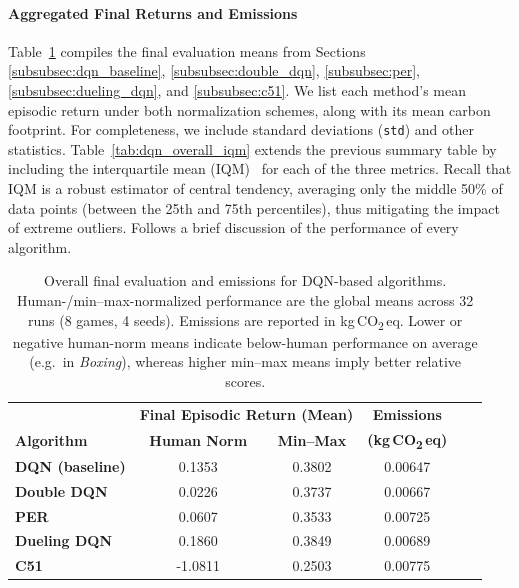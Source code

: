 \paragraph{Aggregated Final Returns and Emissions}
Table~\ref{tab:dqn_overall} compiles the final evaluation means from Sections \ref{subsubsec:dqn_baseline}, \ref{subsubsec:double_dqn}, \ref{subsubsec:per}, \ref{subsubsec:dueling_dqn}, and \ref{subsubsec:c51}. We list each method's mean episodic return under both normalization schemes, along with its mean carbon footprint. For completeness, we include standard deviations (\texttt{std}) and other statistics. Table~\ref{tab:dqn_overall_iqm} extends the previous summary table by including the interquartile mean (IQM)~\cite{agarwal:statistical_precipice} for each of the three metrics. Recall that IQM is a robust estimator of central tendency, averaging only the middle 50\% of data points (between the 25th and 75th percentiles), thus mitigating the impact of extreme outliers. Follows a brief discussion of the performance of every algorithm.

\begin{table}
	\caption{Overall final evaluation and emissions for DQN-based algorithms. 
		Human-/min--max-normalized performance are the global means across 32 runs (8 games, 4 seeds). 
		Emissions are reported in kg\,CO\textsubscript{2}\,eq. 
		Lower or negative human-norm means indicate below-human performance on average (e.g.\ in \emph{Boxing}), 
		whereas higher min--max means imply better relative scores.}
	\label{tab:dqn_overall}
	\centering
	\begin{tabular}{lccccc}
		\toprule
		& \multicolumn{2}{c}{\textbf{Final Episodic Return (Mean)}} & 
		\multicolumn{1}{c}{\textbf{Emissions}} \\
		\cmidrule(lr){2-3} \cmidrule(lr){4-4}
		\textbf{Algorithm} & \textbf{Human Norm} & \textbf{Min--Max} & \textbf{(kg\,CO\textsubscript{2}\,eq)} \\
		\midrule
		\textbf{DQN (baseline)} & 0.1353 & 0.3802 & 0.00647 \\
		\textbf{Double DQN}     & 0.0226 & 0.3737 & 0.00667 \\
		\textbf{PER}            & 0.0607 & 0.3533 & 0.00725 \\
		\textbf{Dueling DQN}    & 0.1860 & 0.3849 & 0.00689 \\
		\textbf{C51}            & -1.0811 & 0.2503 & 0.00775 \\
		\bottomrule
	\end{tabular}
\end{table}

